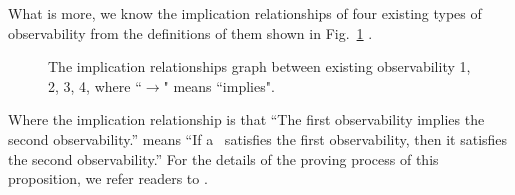 What is more, we know the implication relationships of four existing types of observability from the definitions of them shown in Fig.~\ref{fig:9} \cite{Zhang2016Observability}. 

 \begin{figure}[thpb]
      \centering
      
      \caption{The implication relationships graph between existing observability 1, 2, 3, 4, where ``$\rightarrow$" means ``implies".}
      \label{fig:9}
   \end{figure}

Where the implication relationship is that ``The first observability implies the second observability.'' means ``If a \BCN\ satisfies the first observability, then it satisfies the second observability.'' For the details of the proving process of this proposition, we refer readers to \cite{Zhang2016Observability}.
   
